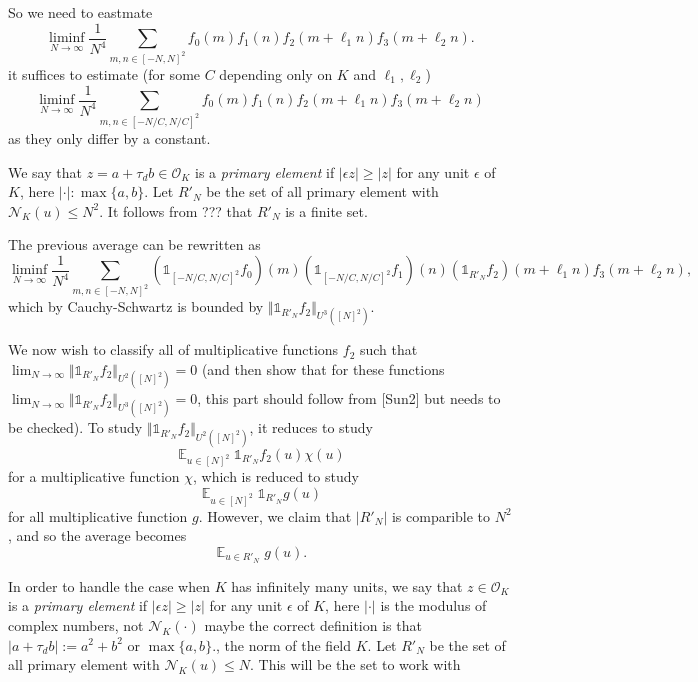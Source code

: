 \documentclass[11pt]{amsart}
\theoremstyle{definition}
\DeclareMathOperator*{\E}{\mathbb{E}}
\newcommand{\NN}{{\mathcal N}}
\begin{document}
{\color{blue}
So we need to eastmate
\begin{equation}\nonumber
    \liminf_{N\to\infty}\frac{1}{N^4}\sum_{m,n\in [-N,N]^{2}} f_{0}(m)f_{1}(n)f_{2}(m+\ell_{1}n)f_{3}(m+\ell_{2}n).
\end{equation}
it suffices to estimate (for some $C$ depending only on $K$ and $\ell_{1},\ell_{2}$)
$$\liminf_{N\to\infty}\frac{1}{N^4}\sum_{m,n\in [-N/C,N/C]^{2}} f_{0}(m)f_{1}(n)f_{2}(m+\ell_{1}n)f_{3}(m+\ell_{2}n)$$
as they only differ by a constant. 

We say that $z=a+\tau_{d}b\in \mathcal{O}_{K}$ is a \emph{primary element} if $\vert \epsilon z\vert\geq \vert z\vert$ for any unit $\epsilon$ of $K$, here $\vert\cdot\vert:\max\{a,b\}$. Let $R'_{N}$ be the set of all primary element with $\NN_{K}(u)\leq N^{2}$. 
It follows from ??? that $R'_{N}$ is a finite set.

The previous average can be rewritten as 
\begin{equation}\nonumber
\liminf_{N\to\infty}\frac{1}{N^4}\sum_{m,n\in [-N,N]^{2}} (\mathds{1}_{[-N/C,N/C]^{2}}f_{0})(m)(\mathds{1}_{[-N/C,N/C]^{2}}f_{1})(n)(\mathds{1}_{R'_{N}}f_{2})(m+\ell_{1}n)f_{3}(m+\ell_{2}n),
\end{equation}
which by Cauchy-Schwartz is bounded by $\Vert \mathds{1}_{R'_{N}}f_{2}\Vert_{U^{3}([N]^{2})}$.

We now wish to classify all of multiplicative functions $f_{2}$ such that $\lim_{N\to\infty}\Vert \mathds{1}_{R'_{N}}f_{2}\Vert_{U^{2}([N]^{2})}=0$ (and then show that for these functions $\lim_{N\to\infty}\Vert \mathds{1}_{R'_{N}}f_{2}\Vert_{U^{3}([N]^{2})}=0$, this part should follow from [Sun2] but needs to be checked). To study $\Vert \mathds{1}_{R'_{N}}f_{2}\Vert_{U^{2}([N]^{2})}$, it reduces to study 
$$\E_{u\in [N]^{2}}\mathds{1}_{R'_{N}}f_{2}(u)\chi(u)$$
for a multiplicative function $\chi$, which is reduced to study 
$$\E_{u\in [N]^{2}}\mathds{1}_{R'_{N}}g(u)$$
for all multiplicative function $g$. However, we claim that $\vert R'_{N}\vert$ is comparible to $N^{2}$, and so the average becomes 
$$\E_{u\in R'_{N}}g(u).$$

In order to handle the case when $K$ has infinitely many units, we say that $z\in \mathcal{O}_{K}$ is a \emph{primary element} if $\vert \epsilon z\vert\geq \vert z\vert$ for any unit $\epsilon$ of $K$, here $\vert\cdot\vert$ is the modulus of complex numbers, not $\NN_{K}(\cdot)$ {\color{red} maybe the correct definition is that $\vert a+\tau_{d}b\vert:=a^{2}+b^{2}$ or $\max\{a,b\}$.}, the norm of the field $K$. Let $R'_{N}$ be the set of all primary element with $\NN_{K}(u)\leq N$. This will be the set to work with


}
\end{document}
